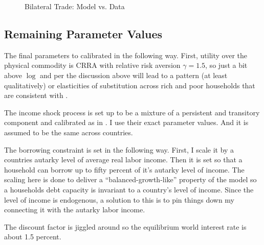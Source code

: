 \documentclass[12pt,pdftex]{article}
\begin{document}
\begin{onehalfspacing}
\begin{figure}[!t]
\caption{Bilateral Trade: Model vs. Data}\label{fig:model-fit}
\end{figure}

\subsection{Remaining Parameter Values}

The final parameters to calibrated in the following way. First, utility over the physical commodity is CRRA with relative risk aversion $\gamma =  1.5$, so just a bit above $\log$ and per the discussion above will lead to a pattern (at least qualitatively) or elasticities of substitution across rich and poor households that are consistent with \citet*{auer2022unequal}.

The income shock process is set up to be a mixture of a persistent and transitory component and calibrated as in \citet*{krueger2016macroeconomics}. I use their exact parameter values. And it is assumed to be the same across countries.

The borrowing constraint is set in the following way. First, I scale it by a countries autarky level of average real labor income. Then it is set so that a household can borrow up to fifty percent of it's autarky level of income. The scaling here is done to deliver a ``balanced-growth-like'' property of the model so a households debt capacity is invariant to a country's level of income. Since the level of income is endogenous, a solution to this is to pin things down my connecting it with the autarky labor income.

The discount factor is jiggled around so the equilibrium world interest rate is about 1.5 percent.


\end{onehalfspacing}
\end{document}
